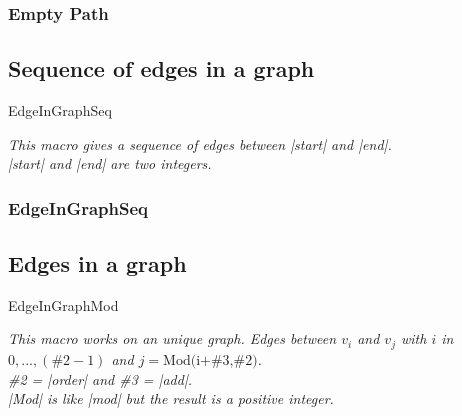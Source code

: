 \subsubsection{Empty Path}
\begin{center}
\begin{tkzexample}
\end{tkzexample}
\end{center}

\vfill
\newpage
\subsection{Sequence of edges in a graph  }
\begin{NewMacroBox}{EdgeInGraphSeq}{}

\medskip
\emph{This macro gives a sequence of edges between |start| and |end|.\\
|start| and |end| are  two integers. }
\end{NewMacroBox}

\subsubsection{EdgeInGraphSeq}
\begin{center}
\begin{tkzexample}
\end{tkzexample}
\end{center}

\newpage
\subsection{Edges in a graph  }
\begin{NewMacroBox}{EdgeInGraphMod}{}

\medskip
\emph{This macro works on an unique graph. Edges between $v_i$ and $v_j$ with $i$ in $0,...,(\text{\#2}-1)$  and $j=\text{Mod(i+\#3,\#2)}$.\\
\#2 = |order| and  \#3 = |add|.\\
|Mod| is like |mod| but the result is a positive integer. }
\end{NewMacroBox}

